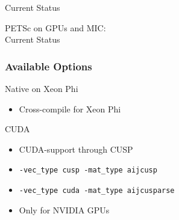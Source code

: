 

\begin{frame}{Current Status}
  \begin{center}
    \Large PETSc on GPUs and MIC: \\[1em] Current Status
  \end{center}
\end{frame}

\begin{frame}[fragile]
\frametitle{Available Options}

 \begin{minipage}{0.75\textwidth}
  \begin{block}{Native on Xeon Phi}
  \begin{itemize}
   \item Cross-compile for Xeon Phi
  \end{itemize}
  \end{block}

  \begin{block}{CUDA}
  \begin{itemize}
   \item CUDA-support through CUSP
   \item \lstinline|-vec_type cusp -mat_type aijcusp|
   \item \lstinline|-vec_type cuda -mat_type aijcusparse|
   \item Only for NVIDIA GPUs
  \end{itemize}
  \end{block}


\end{minipage}
\end{frame}

